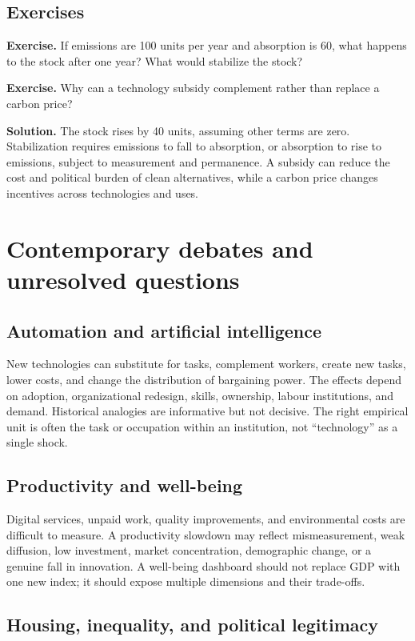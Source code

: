 \documentclass[11pt,oneside,openany]{book}
\newcommand{\exercise}[1]{\textbf{Exercise.} #1}
\newcommand{\solution}[1]{\textbf{Solution.} #1}
\begin{document}
\section{Exercises}

\exercise{If emissions are 100 units per year and absorption is 60, what happens to the stock after one year? What would stabilize the stock?}

\exercise{Why can a technology subsidy complement rather than replace a carbon price?}

\solution{The stock rises by 40 units, assuming other terms are zero. Stabilization requires emissions to fall to absorption, or absorption to rise to emissions, subject to measurement and permanence. A subsidy can reduce the cost and political burden of clean alternatives, while a carbon price changes incentives across technologies and uses.}

\chapter{Contemporary debates and unresolved questions}
\label{ch:debates}

\section{Automation and artificial intelligence}

New technologies can substitute for tasks, complement workers, create new tasks, lower costs, and change the distribution of bargaining power. The effects depend on adoption, organizational redesign, skills, ownership, labour institutions, and demand. Historical analogies are informative but not decisive. The right empirical unit is often the task or occupation within an institution, not ``technology'' as a single shock.

\section{Productivity and well-being}

Digital services, unpaid work, quality improvements, and environmental costs are difficult to measure. A productivity slowdown may reflect mismeasurement, weak diffusion, low investment, market concentration, demographic change, or a genuine fall in innovation. A well-being dashboard should not replace GDP with one new index; it should expose multiple dimensions and their trade-offs.

\section{Housing, inequality, and political legitimacy}
\end{document}
